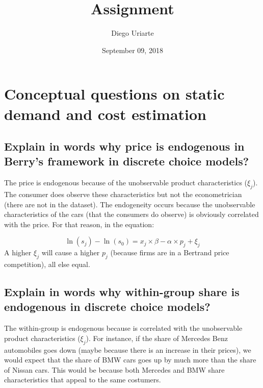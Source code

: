 \documentclass[]{article}
\title{Assignment}
\author{Diego Uriarte}
\date{September 09, 2018}
\begin{document}
\maketitle

\hypertarget{conceptual-questions-on-static-demand-and-cost-estimation}{%
\section{Conceptual questions on static demand and cost
estimation}\label{conceptual-questions-on-static-demand-and-cost-estimation}}

\hypertarget{explain-in-words-why-price-is-endogenous-in-berrys-framework-in-discrete-choice-models}{%
\subsection{Explain in words why price is endogenous in Berry's
framework in discrete choice
models?}\label{explain-in-words-why-price-is-endogenous-in-berrys-framework-in-discrete-choice-models}}

The price is endogenous because of the unobservable product
characteristics (\(\xi_j\)). The consumer does observe these
characteristics but not the econometrician (there are not in the
dataset). The endogeneity occurs because the unobservable
characteristics of the cars (that the consumers do observe) is obviously
correlated with the price. For that reason, in the equation:

\[ \ln(s_j) - \ln(s_0) = x_j \times \beta - \alpha \times p_j + \xi_j\]
A higher \(\xi_j\) will cause a higher \(p_j\) (because firms are in a
Bertrand price competition), all else equal.

\hypertarget{explain-in-words-why-within-group-share-is-endogenous-in-discrete-choice-models}{%
\subsection{Explain in words why within-group share is endogenous in
discrete choice
models?}\label{explain-in-words-why-within-group-share-is-endogenous-in-discrete-choice-models}}

The within-group is endogenous because is correlated with the
unobservable product characteristics (\(\xi_j\)). For instance, if the
share of Mercedes Benz automobiles goes down (maybe because there is an
increase in their prices), we would expect that the share of BMW cars
goes up by much more than the share of Nissan cars. This would be
because both Mercedes and BMW share characteristics that appeal to the
same costumers.
\end{document}
